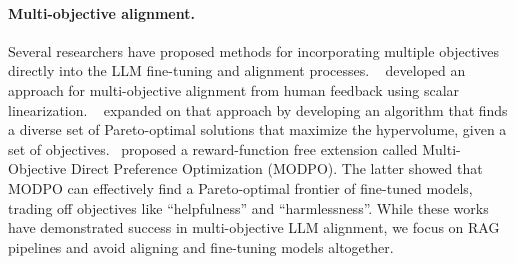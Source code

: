 \paragraph{Multi-objective alignment.} Several researchers have proposed methods for incorporating multiple objectives directly into the LLM fine-tuning and alignment processes. ~\citet{li2020deep} developed an approach for multi-objective alignment from human feedback using scalar linearization. ~\cite{mukherjee2024multi} expanded on that approach by developing an algorithm that finds a diverse set of Pareto-optimal solutions that maximize the hypervolume, given a set of objectives.~\cite{zhou2024beyond} proposed a reward-function free extension called Multi-Objective Direct Preference Optimization (MODPO). The latter showed that MODPO can effectively find a Pareto-optimal frontier of fine-tuned models, trading off objectives like ``helpfulness'' and ``harmlessness''. While these works have demonstrated success in multi-objective LLM alignment, we focus on RAG pipelines and avoid aligning and fine-tuning models altogether. 












